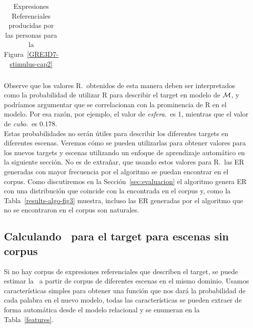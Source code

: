 \begin{table}[h!]
\begin{center}
\begin{tabular}{|l|c|c|}
\hline
\end{tabular}
\caption{Expresiones Referenciales producidas por las personas para la Figura~\ref{GRE3D7-stimulus-cap2}}\label{corpus-distribution}
\end{center}
\end{table}


Observe que los valores R.\puse\ obtenidos de esta manera deben ser
interpretados como la probabilidad de utilizar R para describir el target en
modelo de $\mathcal{M} $, y podr\'{i}amos argumentar que se correlacionan con la
 prominencia de R en el modelo. Por esa raz\'on, por ejemplo, el
valor de \emph{esfera}.\puse\ es 1, mientras que el valor de
\emph{cubo}.\puse\ es 0.178. \\

Estas probabilidades no ser\'an \'utiles
para describir los diferentes targets en diferentes escenas. Veremos c\'omo se
pueden utilizarlas para obtener valores para los nuevos targets y escenas utilizando un
enfoque de aprendizaje autom\'atico en la siguiente secci\'on. No es de extra\~nar,
que usando estos valores para R.\puse\ las ER generadas con mayor frecuencia por el
algoritmo se puedan encontrar en el corpus. Como discutiremos en la Secci\'on~\ref{sec:evaluacion} el algoritmo genera ER
con una distribuci\'on que coincide con la encontrada en el corpus y, como la
Tabla~\ref{results-algo-fig3} muestra, incluso las ER generadas por el algoritmo que no se encontraron
en el corpus son naturales.





\subsection{Calculando \puse\ para el target para escenas sin corpus } 
\label{subsec:learning}

%

Si no hay corpus de expresiones referenciales que describen el target, se puede estimar la \puse~a partir de corpus de
diferentes escenas en el mismo dominio.
Usamos caracter\'isticas simples para obtener una funci\'on que nos dar\'a la probabilidad de cada palabra en el nuevo modelo, todas las caracter\'isticas se pueden extraer de forma autom\'atica desde el modelo relacional y se enumeran en la Tabla~\ref{features}.

